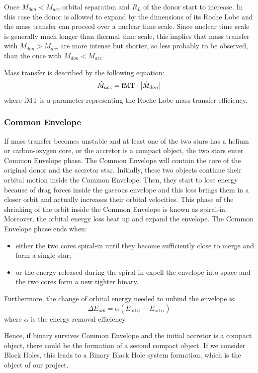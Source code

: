 \documentclass[prb,twocolumn,9pt]{revtex4-1}
\begin{document}
Once \(M_{don} < M_{acc}\) orbital separation and \(R_L\) of the donor start to increase. In this case the donor is allowed to expand by the dimensions of its Roche Lobe and the mass transfer can proceed over a nuclear time scale. 
Since nuclear time scale is generally much longer than thermal time scale, this implies that mass transfer with \( M_{don} > M_{acc}\) are more intense but shorter, so less probably to be observed, than the once with \(M_{don} < M_{acc}\).

Mass transfer is described by the following equation:
\begin{equation}
  \dot{M}_{acc} = \text{fMT} \cdot \abs{\dot{M}_{don}}
\end{equation}
where fMT is a parameter representing the Roche Lobe mass transfer efficiency.


\subsubsection{Common Envelope}
If mass transfer becomes unstable and at least one of the two stars has a helium or carbon-oxygen core, or the accretor is a compact object, the two stars enter Common Envelope phase. 
The Common Envelope will contain the core of the original donor and the accretor star. Initially, these two objects continue their orbital motion inside the Common Envelope. Then, they start to lose energy because of drag forces inside the gaseous envelope and this loss brings them in a closer orbit and actually increases their orbital velocities. This phase of the shrinking of the orbit inside the Common Envelope is known as spiral-in.
Moreover, the orbital energy loss heat up and expand the envelope.
The Common Envelope phase ends when:
\begin{itemize}
    \item either the two cores spiral-in until they become sufficiently close to merge and form a single star;
    \item or the energy released during the spiral-in expell the envelope into space and the two cores form a new tighter binary.
\end{itemize}
Furthermore, the change of orbital energy needed to unbind the envelope is:
\begin{equation}
   \Delta E_{orb} = \alpha (E_{\text{orb,f}} - E_{\text{orb,i}})
\end{equation}
where $\alpha$ is the energy removal efficiency. 

Hence, if binary survives Common Envelope and the initial accretor is a compact object, there could be the formation of a second compact object. If we consider Black Holes, this leads to a Binary Black Hole system formation, which is the object of our project.
\end{document}
